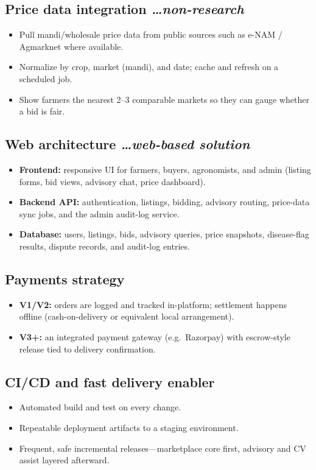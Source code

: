 \documentclass[11pt,a4paper]{article}
\newcommand{\BvrHint}[1]{%
  {\normalfont\normalsize\itshape\hfill #1}}
\begin{document}
\subsection{Price data integration %
  \BvrHint{\ldots non-research}}
\begin{itemize}[leftmargin=0.7cm]
    \item Pull mandi/wholesale price data from public sources such as e-NAM / Agmarknet where available.
    \item Normalize by crop, market (mandi), and date; cache and refresh on a scheduled job.
    \item Show farmers the nearest 2--3 comparable markets so they can gauge whether a bid is fair.
\end{itemize}

\subsection{Web architecture %
  \BvrHint{\ldots web-based solution}}
\begin{itemize}[leftmargin=0.7cm]
    \item \textbf{Frontend:} responsive UI for farmers, buyers, agronomists, and admin (listing forms, bid views, advisory chat, price dashboard).
    \item \textbf{Backend API:} authentication, listings, bidding, advisory routing, price-data sync jobs, and the admin audit-log service.
    \item \textbf{Database:} users, listings, bids, advisory queries, price snapshots, disease-flag results, dispute records, and audit-log entries.
\end{itemize}

\subsection{Payments strategy}
\begin{itemize}[leftmargin=0.7cm]
    \item \textbf{V1/V2:} orders are logged and tracked in-platform; settlement happens offline (cash-on-delivery or equivalent local arrangement).
    \item \textbf{V3+:} an integrated payment gateway (e.g.\ Razorpay) with escrow-style release tied to delivery confirmation.
\end{itemize}

\subsection{CI/CD and fast delivery enabler}
\begin{itemize}[leftmargin=0.7cm]
    \item Automated build and test on every change.
    \item Repeatable deployment artifacts to a staging environment.
    \item Frequent, safe incremental releases---marketplace core first, advisory and CV assist layered afterward.
\end{itemize}
\end{document}
